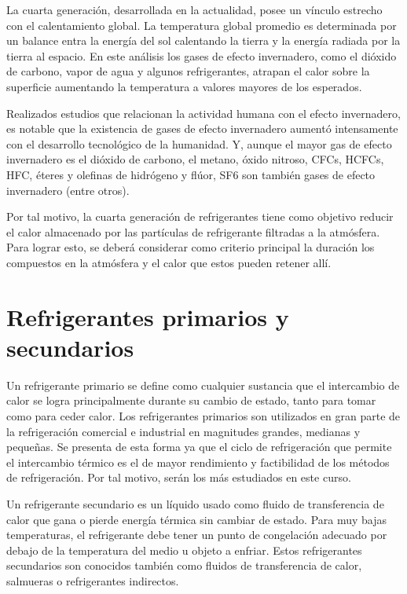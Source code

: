 	La cuarta generación, desarrollada en la actualidad, posee un vínculo estrecho con el calentamiento global. La temperatura global promedio es determinada por un balance entra la energía del sol calentando la tierra y la energía radiada por la tierra al espacio. En este análisis los gases de efecto invernadero, como el dióxido de carbono, vapor de agua y algunos refrigerantes, atrapan el calor sobre la superficie aumentando la temperatura a valores mayores de los esperados.

	Realizados estudios que relacionan la actividad humana con el efecto invernadero, es notable que la existencia de gases de efecto invernadero aumentó intensamente con el desarrollo tecnológico de la humanidad. Y, aunque el mayor gas de efecto invernadero es el dióxido de carbono, el metano, óxido nitroso, CFCs, HCFCs, HFC, éteres y olefinas de hidrógeno y flúor, SF6 son también gases de efecto invernadero (entre otros).
	 
	Por tal motivo, la cuarta generación de refrigerantes tiene como objetivo reducir el calor almacenado por las partículas de refrigerante filtradas a la atmósfera. Para lograr esto, se deberá considerar como criterio principal la duración los compuestos en la atmósfera y el calor que estos pueden retener allí.

	\section{Refrigerantes primarios y secundarios}

	Un refrigerante primario se define como cualquier sustancia que el intercambio de calor se logra principalmente durante su cambio de estado, tanto para tomar como para ceder calor. Los refrigerantes primarios son utilizados en gran parte de la refrigeración comercial e industrial en magnitudes grandes, medianas y pequeñas. Se presenta de esta forma ya que el ciclo de refrigeración que permite el intercambio térmico es el de mayor rendimiento y factibilidad de los métodos de refrigeración. Por tal motivo, serán los más estudiados en este curso.
	
	Un refrigerante secundario es un líquido usado como fluido de transferencia de calor que gana o pierde energía térmica sin cambiar de estado. Para muy bajas temperaturas, el refrigerante debe tener un punto de congelación adecuado por debajo de la temperatura del medio u objeto a enfriar. Estos refrigerantes secundarios son conocidos también como fluidos de transferencia de calor, salmueras o refrigerantes indirectos.


